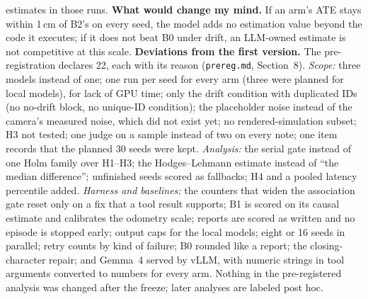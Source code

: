 \documentclass[conference]{IEEEtran}
\begin{document}
estimates in those runs.
\textbf{What would change my mind.} If an arm's ATE stays within 1\,cm of B2's on every seed, the model adds no
estimation value beyond the code it executes; if it does not beat B0 under drift, an LLM-owned estimate is not
competitive at this scale.
\textbf{Deviations from the first version.} The pre-registration declares 22, each with its reason
(\texttt{prereg.md}, Section~8). \emph{Scope:} three models instead of one; one run per seed for every arm (three were planned
for local models), for lack of GPU time; only the drift condition with duplicated IDs (no no-drift block, no
unique-ID condition); the placeholder noise instead of the
camera's measured noise, which did not exist yet; no rendered-simulation subset; H3 not tested; one judge on a
sample instead of two on every note; one item records that the planned 30 seeds were kept. \emph{Analysis:} the serial gate instead of
one Holm family over H1--H3; the Hodges--Lehmann estimate instead of ``the median difference''; unfinished
seeds scored as fallbacks; H4 and a pooled latency percentile added. \emph{Harness and baselines:} the
counters that widen the association gate reset only on a fix that a tool result supports; B1 is scored on its
causal estimate and calibrates the odometry scale; reports are scored as written and no episode is stopped
early; output caps for the local models; eight or 16 seeds in parallel; retry counts by kind of failure; B0
rounded like a report; the closing-character repair; and Gemma~4 served by vLLM, with numeric strings in tool
arguments converted to numbers for every arm. Nothing in the pre-registered analysis was changed
after the freeze; later analyses are labeled post hoc.
\end{document}
